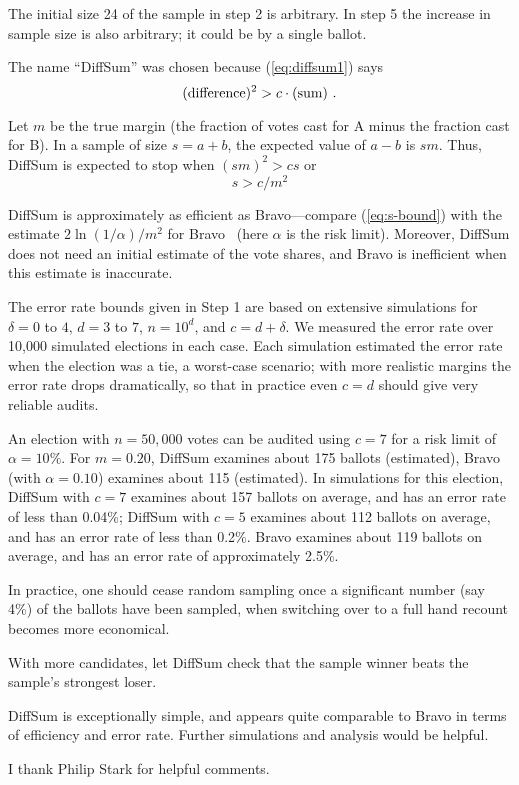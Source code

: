 \documentclass[twocolumn]{article}
\begin{document}
The initial size 24 of the sample in step 2 is arbitrary.
In step 5 the increase in sample size is also arbitrary; it could be by a
single ballot.

The name ``{\sc DiffSum}'' was chosen because
(\ref{eq:diffsum1}) says
\begin{equation}
     (\hbox{difference})^2 > c \cdot (\hbox{sum})\ .
  \end{equation}

 Let $m$ be the true margin (the
fraction of votes cast for A minus the fraction cast for B).
In a sample of size $s = a+b$,
the expected value of $a-b$ is $sm$.  Thus, {\sc DiffSum} is expected to
stop when
$ 
       (sm)^2 > cs
$
or
\begin{equation}
        s > c / m^2
\label{eq:s-bound}
\end{equation}

{\sc DiffSum} is approximately as efficient as {\sc Bravo}---compare
(\ref{eq:s-bound}) with the estimate $2 \ln(1/\alpha) / m^2$ for {\sc
  Bravo}~\cite{LindemanStYa12} (here $\alpha$ is the risk limit).
Moreover, {\sc DiffSum} does not need an initial estimate of the vote
shares, and {\sc Bravo} is inefficient when this estimate is
inaccurate.

The error rate bounds given in Step 1 are based on
extensive simulations for 
$\delta=0$ to $4$, 
$d=3$ to $7$,
$n=10^d$, and $c=d+\delta$. 
We measured the error rate over 10,000 simulated elections
in each case.
Each simulation estimated the error rate when the election was
a tie, a worst-case scenario;
with more realistic margins the error
rate drops dramatically, so that in practice
even $c=d$ should give very reliable audits.

\smallskip
{} 
An election with $n=50,000$ votes can be audited using $c=7$ for 
a risk limit
of $\alpha=10\%$.
For $m=0.20$, {\sc DiffSum} examines about 175 ballots (estimated),
{\sc Bravo} (with $\alpha=0.10$) examines about 115 (estimated).
In simulations for this election,
{\sc DiffSum} with $c=7$
examines about 157 ballots on average, and has an error rate of less than 0.04\%;  
{\sc DiffSum} with $c=5$
examines about 112 ballots on average, and has an error rate of less than 0.2\%.
Bravo examines about 119 ballots on average, and has an error rate of approximately 2.5\%.

\smallskip
{}
In practice, one should cease random sampling once a significant
number (say 4\%) of the ballots have been sampled, when switching over
to a full hand recount becomes more economical.

With more candidates, let {\sc DiffSum} check that the
sample winner beats the sample's strongest loser.

\smallskip
{}
{\sc DiffSum} is exceptionally simple, and 
appears quite comparable to {\sc Bravo}
in terms of efficiency and error rate.  Further simulations and
analysis would be helpful.

\smallskip
{} I thank Philip Stark for helpful comments.

\small
\vspace*{-0.2in}


\end{document}
